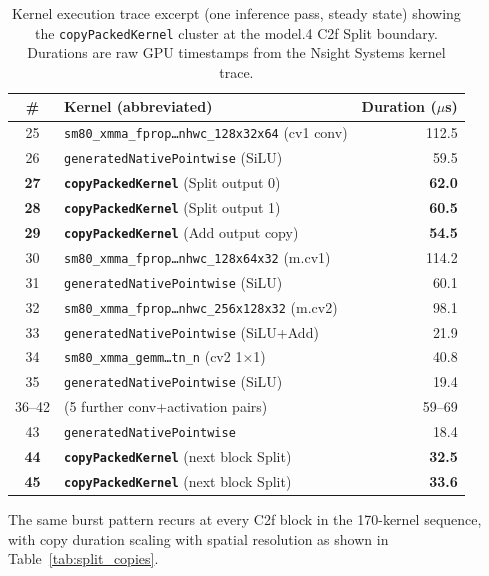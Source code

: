 \documentclass[12pt,a4paper]{report}
\begin{document}
\begin{table}[h]
\centering
\caption{Kernel execution trace excerpt (one inference pass, steady state) showing the
\texttt{copyPackedKernel} cluster at the model.4 C2f Split boundary.
Durations are raw GPU timestamps from the Nsight Systems kernel trace.}
\label{tab:kernel_trace}
\begin{tabular}{clr}
\toprule
\# & Kernel (abbreviated) & Duration ($\mu$s) \\
\midrule
25 & \texttt{sm80\_xmma\_fprop\ldots{}nhwc\_128x32x64} (cv1 conv)  & 112.5 \\
26 & \texttt{generatedNativePointwise} (SiLU)                       &  59.5 \\
\textbf{27} & \textbf{\texttt{copyPackedKernel}} (Split output 0)    & \textbf{62.0} \\
\textbf{28} & \textbf{\texttt{copyPackedKernel}} (Split output 1)    & \textbf{60.5} \\
\textbf{29} & \textbf{\texttt{copyPackedKernel}} (Add output copy)   & \textbf{54.5} \\
30 & \texttt{sm80\_xmma\_fprop\ldots{}nhwc\_128x64x32} (m.cv1)     & 114.2 \\
31 & \texttt{generatedNativePointwise} (SiLU)                       &  60.1 \\
32 & \texttt{sm80\_xmma\_fprop\ldots{}nhwc\_256x128x32} (m.cv2)     &  98.1 \\
33 & \texttt{generatedNativePointwise} (SiLU+Add)                   &  21.9 \\
34 & \texttt{sm80\_xmma\_gemm\ldots{}tn\_n} (cv2 1$\times$1)       &  40.8 \\
35 & \texttt{generatedNativePointwise} (SiLU)                       &  19.4 \\
36--42 & (5 further conv+activation pairs)                          & 59--69 \\
43 & \texttt{generatedNativePointwise}                               &  18.4 \\
\textbf{44} & \textbf{\texttt{copyPackedKernel}} (next block Split)  & \textbf{32.5} \\
\textbf{45} & \textbf{\texttt{copyPackedKernel}} (next block Split)  & \textbf{33.6} \\
\bottomrule
\end{tabular}
\end{table}

\noindent The same burst pattern recurs at every C2f block in the 170-kernel sequence, with copy
duration scaling with spatial resolution as shown in Table~\ref{tab:split_copies}.
\end{document}
